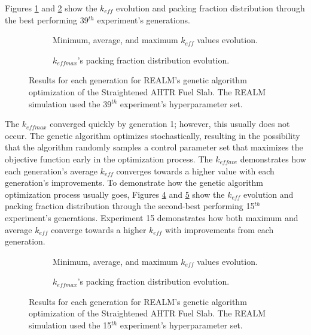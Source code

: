 Figures \ref{fig:keff_conv_39} and \ref{fig:pf_39} show the $k_{eff}$ evolution
and packing fraction distribution through the best performing 39$^{th}$ 
experiment's generations.
\begin{figure}[]
    \centering
    \begin{subfigure}{\textwidth}
    \caption{Minimum, average, and maximum $k_{eff}$ values evolution.}
    \label{fig:keff_conv_39}
    \end{subfigure}
    \begin{subfigure}{\textwidth}
        \caption{$k_{eff max}$'s packing fraction distribution evolution.}
        \label{fig:pf_39}
    \end{subfigure}
    \caption{ Results for each generation for \gls{REALM}'s genetic algorithm optimization 
    of the Straightened \acrfull{AHTR} Fuel Slab. The \gls{REALM} simulation used 
    the 39$^{th}$ experiment's hyperparameter set.}
    \label{fig:39}
\end{figure}
The $k_{eff max}$ converged quickly by generation 1; however, this usually 
does not occur. 
The genetic algorithm optimizes stochastically, resulting in the possibility 
that the algorithm randomly samples a control parameter set that maximizes 
the objective function early in the optimization process. 
The $k_{eff ave}$ demonstrates how each generation's average $k_{eff}$
converges towards a higher value with each generation's improvements.
To demonstrate how the genetic algorithm optimization process usually goes, 
Figures \ref{fig:keff_conv_15} and \ref{fig:pf_15} show the $k_{eff}$ evolution 
and packing fraction distribution through the second-best performing 15$^{th}$ 
experiment's generations.  
Experiment 15 demonstrates how both maximum and average $k_{eff}$ converge
towards a higher $k_{eff}$ with improvements from each generation.
\begin{figure}[]
    \centering
    \begin{subfigure}{\textwidth}
    \caption{Minimum, average, and maximum $k_{eff}$ values evolution.}
    \label{fig:keff_conv_15}
    \end{subfigure}
    \begin{subfigure}{\textwidth}
        \caption{$k_{eff max}$'s packing fraction distribution evolution.}
        \label{fig:pf_15}
    \end{subfigure}
    \caption{ Results for each generation for \gls{REALM}'s genetic algorithm optimization 
    of the Straightened \acrfull{AHTR} Fuel Slab. The \gls{REALM} simulation used 
    the 15$^{th}$ experiment's hyperparameter set.}
    \label{fig:15}
\end{figure}

